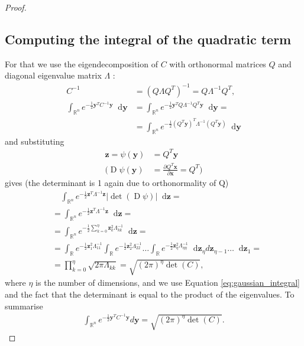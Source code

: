 \documentclass{paper}
\newcommand{\abs}[1]{\left| #1 \right|}
\newcommand{\vr}[1]{\ensuremath{\boldsymbol{#1}}}
\newcommand{\f}[1]{\operatorname{#1}}
\newcommand*\diff{\mathop{}\!\mathrm{d}}
\newcommand{\yvec}[0]{\ensuremath{\vr{y}}}
\newcommand{\zvec}[0]{\ensuremath{\vr{z}}}
\begin{document}
\begin{proof}
\subsection*{Computing the integral of the quadratic term}
For that we use the eigendecomposition of $C$ with orthonormal matrices $Q$ and diagonal eigenvalue matrix $\Lambda$ \cite{wiki_eigendecomp}:
\begin{align*}
	C^{-1} &= (Q \Lambda Q^T)^{-1} = Q \Lambda^{-1} Q^T, \nonumber \\
	\int_{\mathbb{R}^n} e^{-\frac{1}{2} \yvec^T C^{-1} \yvec}  \diff \yvec
	&= \int_{\mathbb{R}^n} e^{-\frac{1}{2} \yvec^T Q \Lambda^{-1} Q^T \yvec}  \diff \yvec =  \nonumber \\
	&= \int_{\mathbb{R}^n} e^{-\frac{1}{2} (Q^T \yvec)^T \Lambda^{-1} (Q^T \yvec)}  \diff \yvec
\end{align*}
and substituting
\begin{align*}
\zvec = \psi(\yvec) &= Q^T \yvec \\
\Bigg( \f{D}\psi(\yvec) &= \frac{\partial Q^T \vr{x}}{\partial \vr{x}} = Q^T \Bigg)
\end{align*}
gives (the determinant is 1 again due to orthonormality of Q)
\begin{align*}
	&\quad \int_{\mathbb{R}^n} e^{-\frac{1}{2} \zvec^T \Lambda^{-1} \zvec} \abs{\f{det}(\f{D}\psi)} \diff \zvec =\\
	&= \int_{\mathbb{R}^n} e^{-\frac{1}{2} \zvec^T \Lambda^{-1} \zvec} \diff \zvec =\\
	&= \int_{\mathbb{R}^n} e^{-\frac{1}{2} \sum_{k=0}^\eta \zvec_k^2 \Lambda_{kk}^{-1} } \diff \zvec =\\
	&= \int_{\mathbb{R}} e^{-\frac{1}{2} \zvec_1^2 \Lambda_{11}^{-1} } \int_{\mathbb{R}} e^{-\frac{1}{2} \zvec_2^2 \Lambda_{22}^{-1} } \dots \int_{\mathbb{R}} e^{-\frac{1}{2} \zvec_\eta^2 \Lambda_{\eta\eta}^{-1} } \diff \zvec_\eta d\zvec_{\eta-1} \dots \diff \zvec_1 =\\
	&= \prod_{k=0}^\eta \sqrt{2 \pi \Lambda_{kk}} = \sqrt{(2 \pi)^\eta \f{det}(C)},
\end{align*}
where $\eta$ is the number of dimensions, and we use Equation \ref{eq:gaussian_integral} and the fact that the determinant is equal to the product of the eigenvalues. To summarise
\begin{align}
	\int_{\mathbb{R}^n} e^{-\frac{1}{2} \yvec^T C^{-1} \yvec}  d\yvec = \sqrt{(2 \pi)^\eta \f{det}(C)}.
\end{align}


\end{proof}
\end{document}
